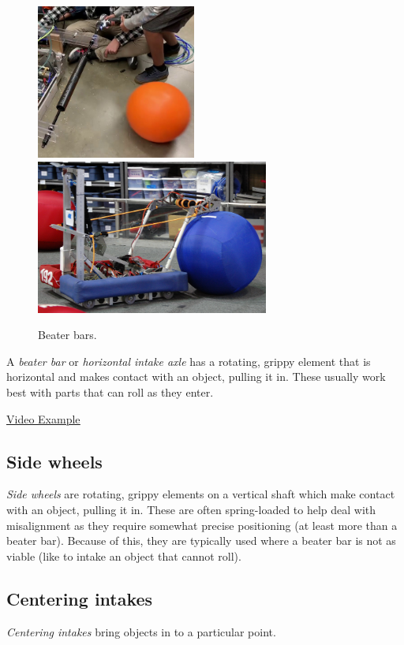 \documentclass[10pt,letterpaper]{book}
\begin{document}
\begin{figure}[H]
	\includegraphics[height=2in]{imgs/intake_beaterbar_1.png}
	\includegraphics[height=2in]{imgs/intake_beaterbar_2.png}
	\caption{Beater bars.}
\end{figure}

A \textit{beater bar} or \textit{horizontal intake axle} has a rotating, grippy element that is horizontal and makes contact with an object, pulling it in. These usually work best with parts that can roll as they enter.

\href{https://www.youtube.com/watch?v=LaoZ8L7H65s}{\color{red}\underline{Video Example}}
\subsection{Side wheels}
\textit{Side wheels} are rotating, grippy elements on a vertical shaft which make contact with an object, pulling it in. These are often spring-loaded to help deal with misalignment as they require somewhat precise positioning (at least more than a beater bar). Because of this, they are typically used where a beater bar is not as viable (like to intake an object that cannot roll).
\subsection{Centering intakes}
\textit{Centering intakes} bring objects in to a particular point.
\end{document}
